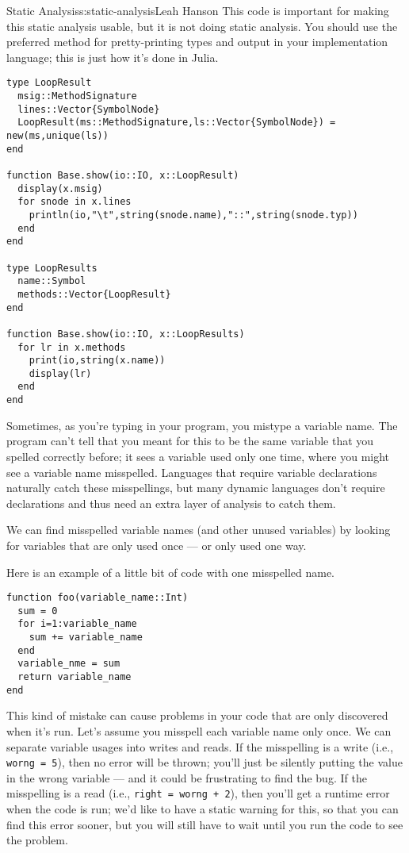 \begin{aosachapter}{Static Analysis}{s:static-analysis}{Leah Hanson}
This code is important for making this static analysis usable, but it is
not doing static analysis. You should use the preferred method for
pretty-printing types and output in your implementation language; this
is just how it's done in Julia.

\begin{verbatim}
type LoopResult
  msig::MethodSignature
  lines::Vector{SymbolNode}
  LoopResult(ms::MethodSignature,ls::Vector{SymbolNode}) = new(ms,unique(ls))
end

function Base.show(io::IO, x::LoopResult)
  display(x.msig)
  for snode in x.lines
    println(io,"\t",string(snode.name),"::",string(snode.typ))
  end
end

type LoopResults
  name::Symbol
  methods::Vector{LoopResult}
end

function Base.show(io::IO, x::LoopResults)
  for lr in x.methods
    print(io,string(x.name))
    display(lr)
  end
end
\end{verbatim}

\label{looking-for-unused-variables}

Sometimes, as you're typing in your program, you mistype a variable
name. The program can't tell that you meant for this to be the same
variable that you spelled correctly before; it sees a variable used only
one time, where you might see a variable name misspelled. Languages that
require variable declarations naturally catch these misspellings, but
many dynamic languages don't require declarations and thus need an extra
layer of analysis to catch them.

We can find misspelled variable names (and other unused variables) by
looking for variables that are only used once --- or only used one way.

Here is an example of a little bit of code with one misspelled name.

\begin{verbatim}
function foo(variable_name::Int)
  sum = 0
  for i=1:variable_name
    sum += variable_name
  end
  variable_nme = sum
  return variable_name
end
\end{verbatim}

This kind of mistake can cause problems in your code that are only
discovered when it's run. Let's assume you misspell each variable name
only once. We can separate variable usages into writes and reads. If the
misspelling is a write (i.e., \texttt{worng = 5}), then no error will be
thrown; you'll just be silently putting the value in the wrong variable
--- and it could be frustrating to find the bug. If the misspelling is a
read (i.e., \texttt{right = worng + 2}), then you'll get a runtime error
when the code is run; we'd like to have a static warning for this, so
that you can find this error sooner, but you will still have to wait
until you run the code to see the problem.


\end{aosachapter}
